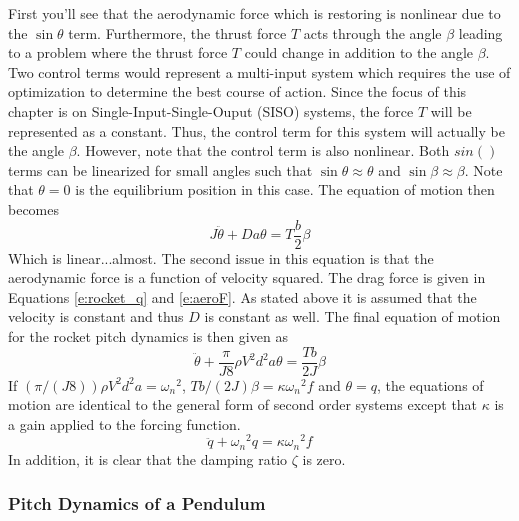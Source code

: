 First you'll see that the aerodynamic force which is restoring is nonlinear due to the $\sin{\theta}$ term. Furthermore, the thrust force $T$ acts through the angle $\beta$ leading to a problem where the thrust force $T$ could change in addition to the angle $\beta$. Two control terms would represent a multi-input system which requires the use of optimization to determine the best course of action. Since the focus of this chapter is on Single-Input-Single-Ouput (SISO) systems, the force $T$ will be represented as a constant. Thus, the control term for this system will actually be the angle $\beta$. However, note that the control term is also nonlinear. Both $sin()$ terms can be linearized for small angles such that $\sin{\theta} \approx \theta$ and $\sin{\beta} \approx \beta$. Note that $\theta=0$ is the equilibrium position in this case. The equation of motion then becomes
\begin{equation}
    J\ddot{\theta} + D a \theta = T \frac{b}{2} \beta
\end{equation}
Which is linear...almost. The second issue in this equation is that the aerodynamic force is a function of velocity squared. The drag force is given in Equations \ref{e:rocket_q} and \ref{e:aeroF}. As stated above it is assumed that the velocity is constant and thus $D$ is constant as well. The final equation of motion for the rocket pitch dynamics is then given as
\begin{equation}
    \ddot{\theta} + \frac{\pi}{J8}\rho V^2 d^2 a \theta = \frac{Tb}{2J} \beta
\end{equation}
If $(\pi/(J8))\rho V^2 d^2 a = {\omega_n}^2$, $Tb/(2J) \beta = \kappa {\omega_n}^2 f$ and $\theta = q$, the equations of motion are identical to the general form of second order systems except that $\kappa$ is a gain applied to the forcing function.  
\begin{equation}
    \ddot{q} + {\omega_n}^2 q = \kappa {\omega_n}^2 f
\end{equation}
In addition, it is clear that the damping ratio $\zeta$ is zero. 

\subsubsection{Pitch Dynamics of a Pendulum}

